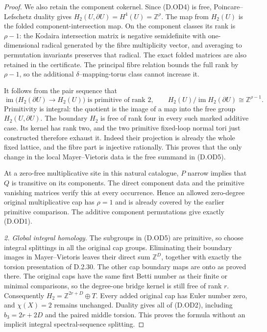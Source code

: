 \begin{proof}
We also retain the component cokernel. Since (D.OD4) is free,
Poincare--Lefschetz duality gives
$H_2(U,\partial U)=H^4(U)=\mathbb Z^\rho$.
The map from $H_2(U)$ is the folded component-intersection
map. On the component classes its rank is $\rho-1$:
the Kodaira intersection matrix is negative semidefinite
with one-dimensional radical generated by the fibre
multiplicity vector, and averaging to permutation invariants
preserves that radical. The exact folded matrices are also
retained in the certificate. The principal fibre relation
bounds the full rank by $\rho-1$, so the additional
$\delta$--mapping-torus class cannot increase it.

It follows from the pair sequence that
\[
 \operatorname{im}\bigl(H_2(\partial U)\to H_2(U)\bigr)
 \text{ is primitive of rank }2,
 \qquad
 H_2(U)/\operatorname{im}H_2(\partial U)
                 \cong\mathbb Z^{\rho-1}.                 \tag{D.OD5}
\]
Primitivity is integral: the quotient is the image of a map
into the free group $H_2(U,\partial U)$.
The boundary $H_2$ is free of rank four in every such marked
additive case. Its kernel has rank two, and the two primitive
fixed-loop normal tori just constructed therefore exhaust it.
Indeed their projection is already the whole fixed lattice,
and the fibre part is injective rationally. This proves that
the only change in the local Mayer--Vietoris data is the
free summand in (D.OD5).

At a zero-free multiplicative site in this natural catalogue,
$P$ narrow implies that $Q$ is transitive on its components.
The direct component data and the primitive vanishing
matrices verify this at every occurrence. Hence an allowed
zero-degree original multiplicative cap has $\rho=1$ and
is already covered by the earlier primitive comparison.
The additive component permutations give exactly (D.OD1).

\emph{2. Global integral homology.}
The subgroups in (D.OD5) are primitive, so choose integral
splittings in all the original cap groups. Eliminating their
boundary images in Mayer--Vietoris leaves their direct sum
$\mathbb Z^D$, together with exactly the torsion presentation
of D.2.30. The other cap boundary maps are onto as proved
there. The original caps have the same first Betti number as
their finite or minimal comparisons, so the degree-one bridge
kernel is still free of rank $r$. Consequently
$H_2=\mathbb Z^{2r+D}\oplus T$.
Every added original cap has Euler number zero, and
$\chi(X)=2$ remains unchanged. Duality gives all of (D.OD2),
including $b_3=2r+2D$ and the paired middle torsion.
This proves the formula without an implicit integral
spectral-sequence splitting.


\end{proof}
